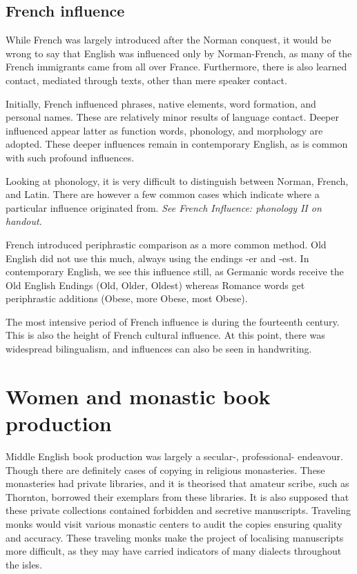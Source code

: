 \documentclass[12pt]{report}
\begin{document}
\section{French influence}

While French was largely introduced after the Norman conquest, it would be wrong
to say that English was influenced only by Norman-French, as many of the French
immigrants came from all over France. Furthermore, there is also learned
contact, mediated through texts, other than mere speaker contact.

Initially, French influenced phrases, native elements, word formation, and
personal names. These are relatively minor results of language contact. Deeper
influenced appear latter as function words, phonology, and morphology are
adopted. These deeper influences remain in contemporary English, as is common
with such profound influences.

Looking at phonology, it is very difficult to distinguish between Norman,
French, and Latin. There are however a few common cases which indicate where a
particular influence originated from. \textit{See French Influence: phonology II
on handout}. 

French introduced periphrastic comparison as a more common method. Old English
did not use this much, always using the endings -er and -est. In contemporary
English, we see this influence still, as Germanic words receive the Old English
Endings (Old, Older, Oldest) whereas Romance words get periphrastic additions
(Obese, more Obese, most Obese).

The most intensive period of French influence is during the fourteenth century.
This is also the height of French cultural influence. At this point, there was
widespread bilingualism, and influences can also be seen in handwriting.

\chapter{Women and monastic book production}

Middle English book production was largely a secular-, professional- endeavour. Though there are definitely cases of copying in religious monasteries. These monasteries had private libraries, and it is theorised that amateur scribe, such as Thornton, borrowed their exemplars from these libraries. It is also supposed that these private collections contained forbidden and secretive manuscripts. Traveling monks would visit various monastic centers to audit the copies ensuring quality and accuracy. These traveling monks make the project of localising manuscripts more difficult, as they may have carried indicators of many dialects throughout the isles.
\end{document}

